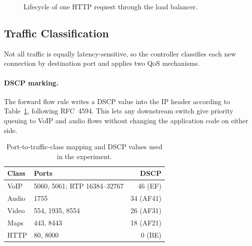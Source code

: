 \documentclass[10pt,a4paper,twocolumn]{article}
\numberwithin{figure}{section}
\numberwithin{table}{section}
\numberwithin{equation}{section}
\begin{document}
\begin{figure}[t]
\centering
{}
\caption{Lifecycle of one HTTP request through the load balancer.}
\label{fig:flow}
\end{figure}

\subsection{Traffic Classification}
\label{sec:tc}

Not all traffic is equally latency-sensitive, so the controller classifies
each new connection by destination port and applies two QoS mechanisms.

\paragraph{DSCP marking.}
The forward flow rule writes a DSCP value into the IP header according to
Table~\ref{tab:dscp}, following RFC~4594. This lets any downstream switch
give priority queuing to VoIP and audio flows without changing the application
code on either side.

\begin{table}[h]
\centering\footnotesize
\setlength{\tabcolsep}{4pt}
\caption{Port-to-traffic-class mapping and DSCP values used in the experiment.}
\label{tab:dscp}
\begin{tabular}{l p{3.0cm} r}
\toprule
\textbf{Class} & \textbf{Ports} & \textbf{DSCP} \\
\midrule
VoIP  & 5060, 5061; RTP 16384--32767 & 46 (EF) \\
Audio & 1755                          & 34 (AF41) \\
Video & 554, 1935, 8554               & 26 (AF31) \\
Maps  & 443, 8443                     & 18 (AF21) \\
HTTP  & 80, 8000                      &  0 (BE) \\
\bottomrule
\end{tabular}
\end{table}
\end{document}
